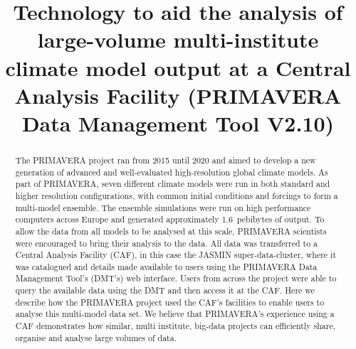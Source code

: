 \documentclass[gmd, manuscript]{copernicus}
\begin{document}
\title{Technology to aid the analysis of large-volume multi-institute climate model output at a Central Analysis Facility (PRIMAVERA Data Management Tool V2.10)}













\received{}
\pubdiscuss{} %
\revised{}
\accepted{}
\published{}




\maketitle



\begin{abstract}
The PRIMAVERA project ran from 2015 until 2020 and aimed to develop a new generation of advanced and well-evaluated high-resolution global climate models. As part of PRIMAVERA, seven different climate models were run in both standard and higher resolution configurations, with common initial conditions and forcings to form a multi-model ensemble. The ensemble simulations were run on high performance computers across Europe and generated approximately 1.6~pebibytes of output. To allow the data from all models to be analysed at this scale, PRIMAVERA scientists were encouraged to bring their analysis to the data. All data was transferred to a Central Analysis Facility (CAF), in this case the JASMIN super-data-cluster, where it was catalogued and details made available to users using the PRIMAVERA Data Management Tool's (DMT's) web interface. Users from across the project were able to query the available data using the DMT and then access it at the CAF. Here we describe how the PRIMAVERA project used the CAF's facilities to enable users to analyse this multi-model data set. We believe that PRIMAVERA's experience using a CAF demonstrates how similar, multi institute, big-data projects can efficiently share, organise and analyse large volumes of data.
\end{abstract}
\end{document}
